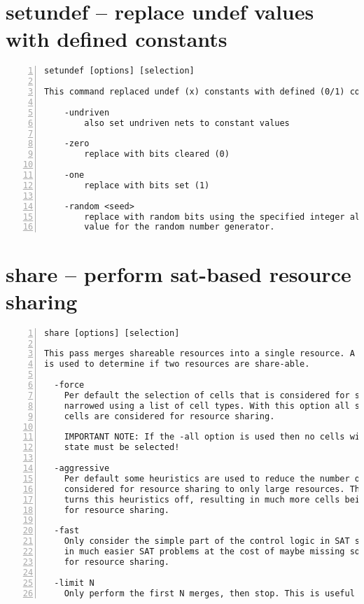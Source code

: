 \section{setundef -- replace undef values with defined constants}
\label{cmd:setundef}
\begin{lstlisting}[numbers=left,frame=single]
    setundef [options] [selection]

This command replaced undef (x) constants with defined (0/1) constants.

    -undriven
        also set undriven nets to constant values

    -zero
        replace with bits cleared (0)

    -one
        replace with bits set (1)

    -random <seed>
        replace with random bits using the specified integer als seed
        value for the random number generator.
\end{lstlisting}

\section{share -- perform sat-based resource sharing}
\label{cmd:share}
\begin{lstlisting}[numbers=left,frame=single]
    share [options] [selection]

This pass merges shareable resources into a single resource. A SAT solver
is used to determine if two resources are share-able.

  -force
    Per default the selection of cells that is considered for sharing is
    narrowed using a list of cell types. With this option all selected
    cells are considered for resource sharing.

    IMPORTANT NOTE: If the -all option is used then no cells with internal
    state must be selected!

  -aggressive
    Per default some heuristics are used to reduce the number of cells
    considered for resource sharing to only large resources. This options
    turns this heuristics off, resulting in much more cells being considered
    for resource sharing.

  -fast
    Only consider the simple part of the control logic in SAT solving, resulting
    in much easier SAT problems at the cost of maybe missing some opportunities
    for resource sharing.

  -limit N
    Only perform the first N merges, then stop. This is useful for debugging.
\end{lstlisting}

